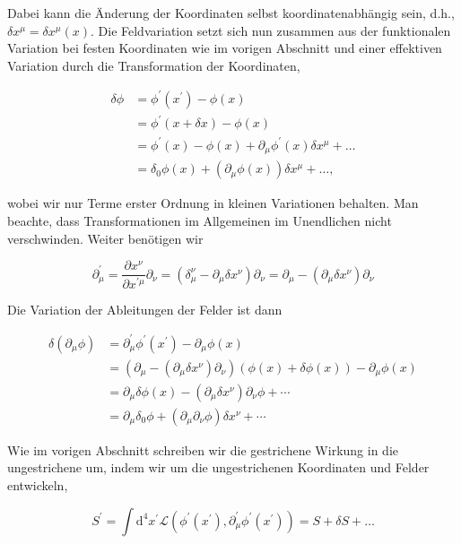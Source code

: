 \documentclass[10pt, letterpaper]{article}
\begin{document}
Dabei kann die Änderung der Koordinaten selbst koordinatenabhängig sein, d.h., $\delta x^{\mu}=\delta x^{\mu}(x)$. Die Feldvariation setzt sich nun zusammen aus der funktionalen Variation bei festen Koordinaten wie im vorigen Abschnitt und einer effektiven Variation durch die Transformation der Koordinaten,

$$
\begin{aligned}
\delta \phi & =\phi^{\prime}\left(x^{\prime}\right)-\phi(x) \\
& =\phi^{\prime}(x+\delta x)-\phi(x) \\
& =\phi^{\prime}(x)-\phi(x)+\partial_{\mu} \phi^{\prime}(x) \delta x^{\mu}+\ldots \\
& =\delta_{0} \phi(x)+\left(\partial_{\mu} \phi(x)\right) \delta x^{\mu}+\ldots,
\end{aligned}
$$

wobei wir nur Terme erster Ordnung in kleinen Variationen behalten. Man beachte, dass Transformationen im Allgemeinen im Unendlichen nicht verschwinden. Weiter benötigen wir

$$
\partial_{\mu}^{\prime}=\frac{\partial x^{\nu}}{\partial x^{\prime \mu}} \partial_{\nu}=\left(\delta_{\mu}^{\nu}-\partial_{\mu} \delta x^{\nu}\right) \partial_{\nu}=\partial_{\mu}-\left(\partial_{\mu} \delta x^{\nu}\right) \partial_{\nu}
$$

Die Variation der Ableitungen der Felder ist dann

$$
\begin{aligned}
\delta\left(\partial_{\mu} \phi\right) & =\partial_{\mu}^{\prime} \phi^{\prime}\left(x^{\prime}\right)-\partial_{\mu} \phi(x) \\
& =\left(\partial_{\mu}-\left(\partial_{\mu} \delta x^{\nu}\right) \partial_{\nu}\right)(\phi(x)+\delta \phi(x))-\partial_{\mu} \phi(x) \\
& =\partial_{\mu} \delta \phi(x)-\left(\partial_{\mu} \delta x^{\nu}\right) \partial_{\nu} \phi+\cdots \\
& =\partial_{\mu} \delta_{0} \phi+\left(\partial_{\mu} \partial_{\nu} \phi\right) \delta x^{\nu}+\cdots
\end{aligned}
$$

Wie im vorigen Abschnitt schreiben wir die gestrichene Wirkung in die ungestrichene um, indem wir um die ungestrichenen Koordinaten und Felder entwickeln,

$$
S^{\prime}=\int \mathrm{d}^{4} x^{\prime} \mathscr{L}\left(\phi^{\prime}\left(x^{\prime}\right), \partial_{\mu}^{\prime} \phi^{\prime}\left(x^{\prime}\right)\right)=S+\delta S+\ldots
$$
\end{document}
